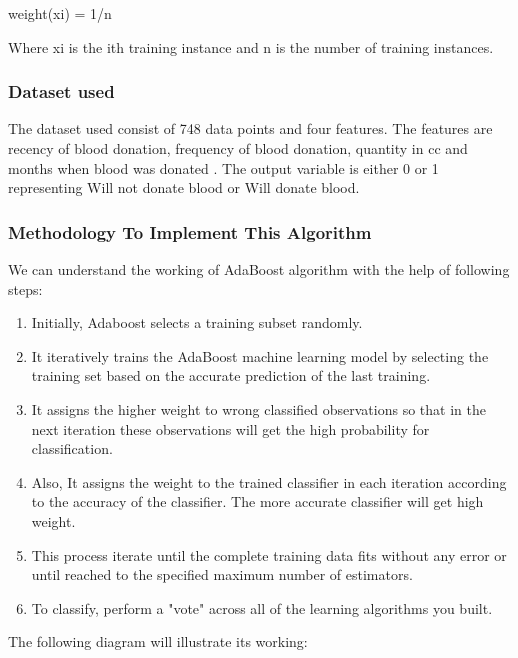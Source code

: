 \documentclass[12pt,a4paper]{article}
\begin{document}
\begin{center}
    weight(xi) = 1/n 
\end{center}

\quad Where xi is the ith training instance and n is the number of training instances.



\subsubsection{Dataset used}

\quad \quad The dataset used consist of 748 data points and four features. The features are recency of blood donation, frequency of blood donation, quantity in cc and months when blood was donated . The output variable is either 0 or 1 representing Will not donate blood or Will donate blood.

\subsubsection{Methodology To Implement This Algorithm}

\quad \quad We can understand the working of AdaBoost algorithm with the help of following steps: 

\begin{enumerate}
    \item Initially, Adaboost selects a training subset randomly. 
    \item It iteratively trains the AdaBoost machine learning model by selecting the training set based on the accurate prediction of the last training. 
    \item It assigns the higher weight to wrong classified observations so that in the next iteration these observations will get the high probability for classification. 
    \item Also, It assigns the weight to the trained classifier in each iteration according to the accuracy of the classifier. The more accurate classifier will get high weight.
    \item This process iterate until the complete training data fits without any error or until reached to the specified maximum number of estimators.
    \item     To classify, perform a "vote" across all of the learning algorithms you built. 
\end{enumerate}

\quad The following diagram will illustrate its working:
\end{document}
